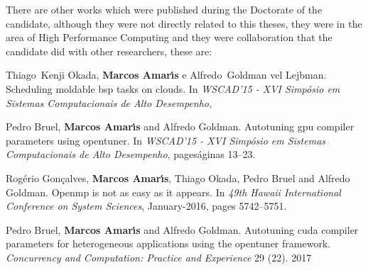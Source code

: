 There are other works which were published during the Doctorate of the candidate, although they were not directly related to this theses, they were in the area of High Performance Computing and they were collaboration that the candidate did with other researchers, these are:


\begin{itemize}
Thiago~Kenji Okada, {\bf Marcos Amar{\'\i}s} e Alfredo~Goldman vel Lejbman.
\newblock Scheduling moldable bsp tasks on clouds.
\newblock In \emph{WSCAD'15 - XVI Simp{\'o}sio em Sistemas Computacionais de
  Alto Desempenho},
    
Pedro Bruel, {\bf Marcos Amar{\'\i}s} and Alfredo Goldman.
\newblock Autotuning gpu compiler parameters using opentuner.
\newblock In \emph{WSCAD'15 - XVI Simp{\'o}sio em Sistemas Computacionais de
  Alto Desempenho}, pages\'{a}ginas 13--23.
  
  
Rog{\'e}rio Gon{\c{c}}alves, {\bf Marcos Amar{\'\i}s}, Thiago Okada, Pedro Bruel and
  Alfredo Goldman.
\newblock Openmp is not as easy as it appears.
\newblock In \emph{49th Hawaii International Conference on System Sciences}, January-2016,
  pages 5742--5751.

Pedro Bruel, {\bf Marcos Amar{\'\i}s} and Alfredo Goldman.
\newblock Autotuning cuda compiler parameters for heterogeneous applications
  using the opentuner framework.
\newblock \emph{Concurrency and Computation: Practice and Experience}
    29 (22). 2017


\end{itemize}  